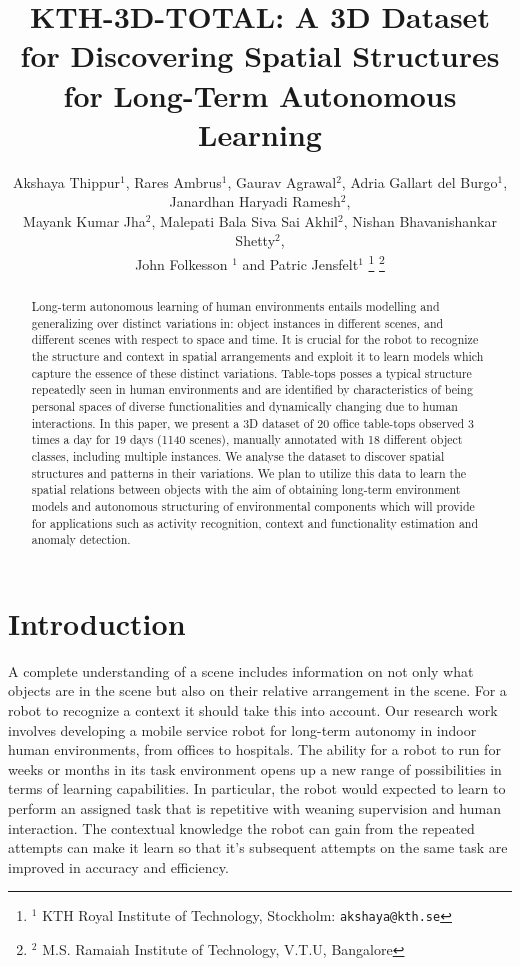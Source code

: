 \documentclass[letterpaper, 10 pt, conference]{ieeeconf}  %
\title{\LARGE \bf
KTH-3D-TOTAL: A 3D Dataset for Discovering Spatial Structures for Long-Term Autonomous
 Learning
}
\author{Akshaya Thippur$^{1}$, Rares Ambrus$^{1}$, Gaurav Agrawal$^{2}$, Adria Gallart del Burgo$^{1}$, Janardhan Haryadi Ramesh$^{2}$, \\Mayank Kumar Jha$^{2}$, Malepati Bala Siva Sai Akhil$^{2}$,  Nishan Bhavanishankar Shetty$^{2}$, \\John Folkesson $^{1}$ and Patric Jensfelt$^{1}$%
\thanks{$^{1}$ KTH Royal Institute of Technology, Stockholm:
        {\tt\small akshaya@kth.se}}%
\thanks{$^{2}$ M.S. Ramaiah Institute of Technology, V.T.U, Bangalore}%
}
\begin{document}
\maketitle
\thispagestyle{empty}
\pagestyle{empty}

\begin{abstract}

Long-term autonomous learning of human environments entails modelling 
and generalizing over distinct variations in: object instances in different scenes, 
and different scenes with respect to space and time. It is crucial for the 
robot to recognize the structure and context in spatial arrangements and 
exploit it to learn models which capture the essence of these distinct variations.
Table-tops posses a typical structure repeatedly seen in human environments
and are identified by characteristics of being personal spaces of diverse
functionalities and dynamically changing due to human interactions. In this
paper, we present a 3D dataset of 20 office table-tops observed 3 times a 
day for 19 days (1140 scenes), manually annotated with 18 different object 
classes, including multiple instances. We analyse the dataset to discover 
spatial structures and patterns in their variations. We plan to utilize 
this data to learn the spatial relations between objects with the 
aim of obtaining long-term environment models and autonomous structuring 
of environmental components which will provide for applications such 
as activity recognition, context and functionality estimation and anomaly detection.

\end{abstract}


\section{Introduction}
\label{sec:Introduction}

A complete understanding of a scene includes information on not only 
what objects are in the scene but also on their relative arrangement in
the scene. For a robot to recognize a context it should take this into
account.  Our research work involves developing
a mobile service robot for long-term autonomy in indoor human
environments, from offices to hospitals.  The ability for a robot to
run for weeks or months in its task environment opens up a new range
of possibilities in terms of learning capabilities. In particular, the
robot would expected to learn to perform an assigned task that is
repetitive with weaning supervision and human interaction. The
contextual knowledge the robot can gain from the repeated attempts can
make it learn so that it's subsequent attempts on the same task are
improved in accuracy and efficiency.
\end{document}
